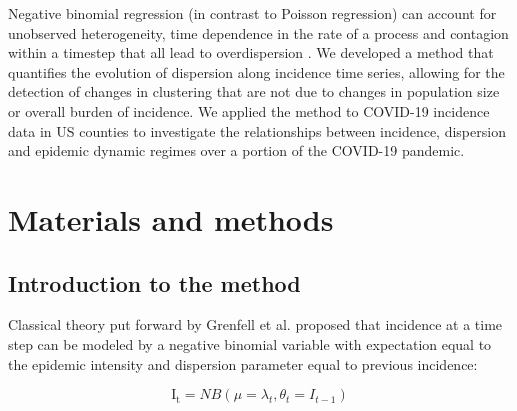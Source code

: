 \documentclass[10pt,letterpaper]{article}
\begin{document}
\noindent Negative binomial regression (in contrast to Poisson regression) can account for unobserved heterogeneity, time dependence in the rate of a process and contagion within a timestep that all lead to overdispersion \cite{barron_analysis_1992}.
We developed a method that quantifies the evolution of dispersion along incidence time series, allowing for the detection of changes in clustering that are not due to changes in population size or overall burden of incidence.
We applied the method to COVID-19 incidence data in US counties to investigate the relationships between incidence, dispersion and epidemic dynamic regimes over a portion of the COVID-19 pandemic. 

\section*{Materials and methods}
\subsection*{Introduction to the method}

Classical theory put forward by Grenfell et al. \cite{grenfell_dynamics_2002} proposed that incidence at a time step can be modeled by a negative binomial variable with expectation equal to the epidemic intensity and dispersion parameter equal to previous incidence:

\begin{equation}
    \mathrm{I_t} = NB(\mu = \lambda_t, \theta_t = I_{t-1})
\end{equation}
\end{document}
